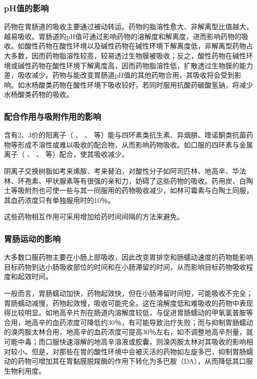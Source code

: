 \subsubsection{pH值的影响}

药物在胃肠道的吸收主要通过被动转运。药物的脂溶性愈大、非解离型比值越大，越易吸收。胃肠道的pH值可通过影响药物的溶解度和解离度，进而影响药物的吸收。如酸性药物在酸性环境以及碱性药物在碱性环境下解离度低，非解离型药物占大多数，因而药物脂溶性较高，较易透过生物膜被吸收；反之，酸性药物在碱性环境或碱性药物在酸性环境下解离度高，因而药物脂溶性低，扩散透过生物膜的能力差，吸收减少。药物与能改变胃肠道pH值的其他药物合用，其吸收将会受到影响。如水杨酸类药物在酸性环境下吸收较好，若同时服用抗酸药碳酸氢钠，将减少水杨酸类药物的吸收。

\subsubsection{配合作用与吸附作用的影响}

含有2、3价的阳离子（ 、 、
等）能与四环素类抗生素、异烟肼、喹诺酮类抗菌药物等形成不溶性或难以吸收的配合物，从而影响药物吸收。如口服的四环素与金属离子（
、 、 等）配合，使其吸收减少。

阴离子交换树脂如考来烯胺、考来替泊，对酸性分子如阿司匹林、地高辛、华法林、环孢素、甲状腺素等有很强的亲和力，妨碍了这些药物的吸收。药用炭、白陶土等吸附剂也可使一些与其一同服用的药物吸收减少，如林可霉素与白陶土同服，其血药浓度只有单独服用时的10％。

这些药物相互作用可采用增加给药时间间隔的方法来避免。

\subsubsection{胃肠运动的影响}

大多数口服药物主要在小肠上部吸收，因此改变胃排空和肠蠕动速度的药物能影响目标药物到达小肠吸收部位的时间和在小肠滞留的时间，从而影响目标药物吸收程度和起效时间。

一般而言，胃肠蠕动加快，药物起效快，但在小肠滞留时间短，可能吸收不完全；胃肠蠕动减慢，药物起效慢，吸收可能完全。这在溶解度低和难吸收的药物中表现得比较明显。如地高辛片剂在肠道内溶解度较低，与促进胃肠蠕动的甲氧氯普胺等合用，地高辛的血药浓度可降低约30％，有可能导致治疗失败；而与抑制胃肠蠕动的溴丙胺太林合用，地高辛的血药浓度可提高30％左右，如不调整地高辛剂量，就可能中毒；而口服快速溶解的地高辛溶液或胶囊，则溴丙胺太林对其吸收的影响相对较小。但是，对那些在胃的酸性环境中会被灭活的药物如左旋多巴，抑制胃肠蠕动的药物可增加其在胃黏膜脱羧酶的作用下转化为多巴胺（DA），从而降低其口服生物利用度。

